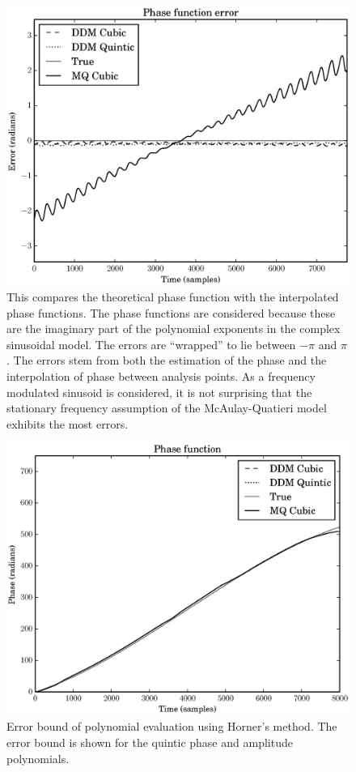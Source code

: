 \begin{figure}[!t]
    \centering
    \includegraphics[width=\figwidthscale\textwidth]{plots/mq_mod_err_comp_phase_err.eps}
    \caption{This compares the theoretical phase function with the interpolated
        phase functions. The phase functions are considered because these are
        the imaginary part of the polynomial exponents in the complex sinusoidal
        model.  The errors are ``wrapped'' to lie between $-\pi$ and $\pi$. The
        errors stem from both the estimation of the phase and the interpolation
        of phase between analysis points. As a frequency modulated sinusoid is
        considered, it is not surprising that the stationary frequency
        assumption of the McAulay-Quatieri model exhibits the most errors.
    \label{plot:mqmoderrcompphaseerr}}
\end{figure}

\begin{figure}[!t]
    \centering
    \includegraphics[width=\figwidthscale\textwidth]{plots/mq_mod_err_comp_phase_func.eps}
    \caption{Error bound of polynomial evaluation using Horner's method. The
    error bound is shown for the quintic phase and amplitude polynomials.
    \label{plot:mqmoderrcompphasefunc}}
\end{figure}

